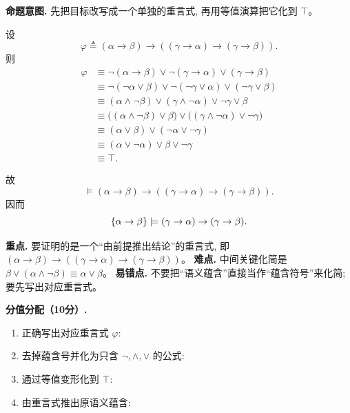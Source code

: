 \documentclass[a4paper, justified]{tufte-handout}
\newenvironment{intention}
  {\par\smallskip\noindent\textbf{命题意图. }\ignorespaces}
  {\par\smallskip}
\begin{document}
\begin{solution}
  \begin{intention}
    先把目标改写成一个单独的重言式, 再用等值演算把它化到 $\top$。
  \end{intention}

  设
  \[
    \varphi \triangleq
      (\alpha \to \beta) \to ((\gamma \to \alpha) \to (\gamma \to \beta)).
  \]
  则
  \begin{align*}
    \varphi
      &\equiv \lnot(\alpha \to \beta) \lor \lnot(\gamma \to \alpha) \lor (\gamma \to \beta) \\
      &\equiv \lnot(\lnot\alpha \lor \beta) \lor \lnot(\lnot\gamma \lor \alpha) \lor (\lnot\gamma \lor \beta) \\
      &\equiv (\alpha \land \lnot\beta) \lor (\gamma \land \lnot\alpha) \lor \lnot\gamma \lor \beta \\
      &\equiv \bigl((\alpha \land \lnot\beta) \lor \beta\bigr)
        \lor \bigl((\gamma \land \lnot\alpha) \lor \lnot\gamma\bigr) \\
      &\equiv (\alpha \lor \beta) \lor (\lnot\alpha \lor \lnot\gamma) \\
      &\equiv (\alpha \lor \lnot\alpha) \lor \beta \lor \lnot\gamma \\
      &\equiv \top.
  \end{align*}

  故
  \[
    \models (\alpha \to \beta) \to ((\gamma \to \alpha) \to (\gamma \to \beta)).
  \]
  因而
  \[
    \{\alpha \to \beta\} \models
      (\gamma \to \alpha) \to (\gamma \to \beta).
  \]

  \begin{remark}
    \textbf{重点.} 要证明的是一个“由前提推出结论”的重言式,
    即 $(\alpha \to \beta) \to ((\gamma \to \alpha) \to (\gamma \to \beta))$。
    \textbf{难点.} 中间关键化简是
    $\beta \lor (\alpha \land \lnot\beta) \equiv \alpha \lor \beta$。
    \textbf{易错点.} 不要把“语义蕴含”直接当作“蕴含符号”来化简;
    要先写出对应重言式。
  \end{remark}

  \textbf{分值分配（10分）.}
  \begin{enumerate}[(1)]
    \item 正确写出对应重言式 $\varphi$: 
    \item 去掉蕴含号并化为只含 $\lnot, \land, \lor$ 的公式: 
    \item 通过等值变形化到 $\top$: 
    \item 由重言式推出原语义蕴含: 
  \end{enumerate}
\end{solution}
\end{document}
